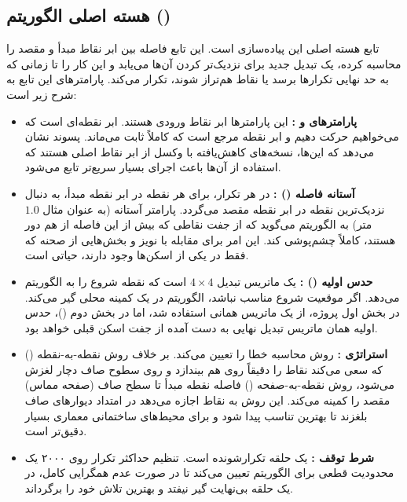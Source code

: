 \documentclass[12pt,a4paper]{article}
\begin{document}
	\subsection{هسته اصلی الگوریتم ()}
	تابع  هسته اصلی این پیاده‌سازی است. این تابع فاصله بین ابر نقاط مبدأ و مقصد را محاسبه کرده، یک تبدیل جدید برای نزدیک‌تر کردن آن‌ها می‌یابد و این کار را تا زمانی که به حد نهایی تکرارها برسد یا نقاط هم‌تراز شوند، تکرار می‌کند. پارامترهای این تابع به شرح زیر است:
	
	\begin{itemize}
		\item \textbf{پارامترهای  و  :} این پارامترها ابر نقاط ورودی هستند.  ابر نقطه‌ای است که می‌خواهیم حرکت دهیم و  ابر نقطه مرجع است که کاملاً ثابت می‌ماند. پسوند  نشان می‌دهد که این‌ها، نسخه‌های کاهش‌یافته با وکسل از ابر نقاط اصلی هستند که استفاده از آن‌ها باعث اجرای بسیار سریع‌تر تابع می‌شود.
		
		\item \textbf{آستانه فاصله () :} در هر تکرار،  برای هر نقطه در ابر نقطه مبدأ، به دنبال نزدیک‌ترین نقطه در ابر نقطه مقصد می‌گردد. پارامتر آستانه (به عنوان مثال $1.0$ متر) به الگوریتم می‌گوید که از جفت نقاطی که بیش از این فاصله از هم دور هستند، کاملاً چشم‌پوشی کند. این امر برای مقابله با نویز و بخش‌هایی از صحنه که فقط در یکی از اسکن‌ها وجود دارند، حیاتی است.
		
		\item \textbf{حدس اولیه () :} یک ماتریس تبدیل $4 \times 4$ است که نقطه شروع را به الگوریتم می‌دهد. اگر موقعیت شروع مناسب نباشد، الگوریتم در یک کمینه محلی گیر می‌کند. در بخش اول پروژه، از یک ماتریس همانی استفاده شد، اما در بخش دوم ()، حدس اولیه همان ماتریس تبدیل نهایی به دست آمده از جفت اسکن قبلی خواهد بود.
		
		\item \textbf{استراتژی  :} روش محاسبه خطا را تعیین می‌کند. بر خلاف روش نقطه-به-نقطه () که سعی می‌کند نقاط را دقیقاً روی هم بیندازد و روی سطوح صاف دچار لغزش می‌شود، روش نقطه-به-صفحه () فاصله نقطه مبدأ تا سطح صاف (صفحه مماس) مقصد را کمینه می‌کند. این روش به نقاط اجازه می‌دهد در امتداد دیوارهای صاف بلغزند تا بهترین تناسب پیدا شود و برای محیط‌های ساختمانی معماری بسیار دقیق‌تر است.
		
		\item \textbf{شرط توقف  :}  یک حلقه تکرارشونده است. تنظیم حداکثر تکرار روی ۲۰۰۰ یک محدودیت قطعی برای الگوریتم تعیین می‌کند تا در صورت عدم همگرایی کامل، در یک حلقه بی‌نهایت گیر نیفتد و بهترین تلاش خود را برگرداند.
	\end{itemize}
	
\end{document}
